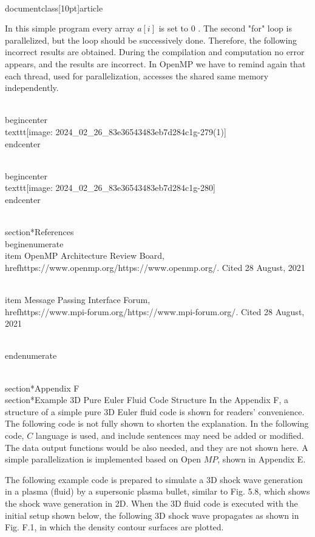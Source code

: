 \\documentclass[10pt]{article}
\begin{document}
{{{{{{In this simple program every array $a[i]$ is set to 0 . The second "for" loop is parallelized, but the loop should be successively done. Therefore, the following incorrect results are obtained. During the compilation and computation no error appears, and the results are incorrect. In OpenMP we have to remind again that each thread, used for parallelization, accesses the shared same memory independently.

\\begin{center}
\\texttt{[image: 2024\_02\_26\_83e36543483eb7d284c1g-279(1)]}
\\end{center}

\\begin{center}
\\texttt{[image: 2024\_02\_26\_83e36543483eb7d284c1g-280]}
\\end{center}

\\section*{References}
\\begin{enumerate}
  \\item OpenMP Architecture Review Board, \\href{https://www.openmp.org/}{https://www.openmp.org/}. Cited 28 August, 2021

  \\item Message Passing Interface Forum, \\href{https://www.mpi-forum.org/}{https://www.mpi-forum.org/}. Cited 28 August, 2021

\\end{enumerate}

\\section*{Appendix F}
\\section*{Example 3D Pure Euler Fluid Code Structure}
In the Appendix F, a structure of a simple pure 3D Euler fluid code is shown for readers' convenience. The following code is not fully shown to shorten the explanation. In the following code, $C$ language is used, and include sentences may need be added or modified. The data output functions would be also needed, and they are not shown here. A simple parallelization is implemented based on Open $M P$, shown in Appendix E.

The following example code is prepared to simulate a 3D shock wave generation in a plasma (fluid) by a supersonic plasma bullet, similar to Fig. 5.8, which shows the shock wave generation in 2D. When the 3D fluid code is executed with the initial setup shown below, the following 3D shock wave propagates as shown in Fig. F.1, in which the density contour surfaces are plotted.

}}}}}}
\end{document}
